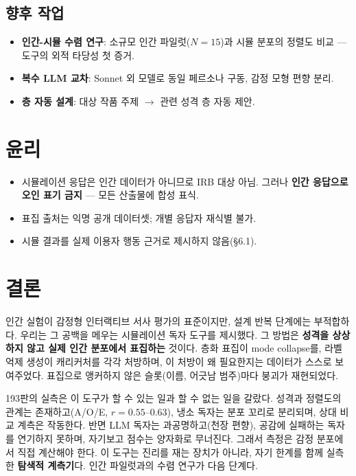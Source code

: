 \documentclass[11pt, a4paper]{article}
\begin{document}
\subsection{향후 작업}

\begin{itemize}
  \item \textbf{인간-시뮬 수렴 연구}: 소규모 인간 파일럿($N=15$)과 시뮬 분포의 정렬도 비교 --- 도구의 외적 타당성 첫 증거.
  \item \textbf{복수 LLM 교차}: Sonnet 외 모델로 동일 페르소나 구동, 감정 모형 편향 분리.
  \item \textbf{층 자동 설계}: 대상 작품 주제 $\rightarrow$ 관련 성격 층 자동 제안.
\end{itemize}

\section{윤리}

\begin{itemize}
  \item 시뮬레이션 응답은 인간 데이터가 아니므로 IRB 대상 아님. 그러나 \textbf{인간 응답으로 오인 표기 금지} --- 모든 산출물에 합성 표식.
  \item 표집 출처는 익명 공개 데이터셋; 개별 응답자 재식별 불가.
  \item 시뮬 결과를 실제 이용자 행동 근거로 제시하지 않음(\S6.1).
\end{itemize}

\section{결론}

인간 실험이 감정형 인터랙티브 서사 평가의 표준이지만, 설계 반복 단계에는 부적합하다. 우리는 그 공백을 메우는 시뮬레이션 독자 도구를 제시했다. 그 방법은 \textbf{성격을 상상하지 않고 실제 인간 분포에서 표집하는} 것이다. 층화 표집이 mode collapse를, 라벨 억제 생성이 캐리커처를 각각 처방하며, 이 처방이 왜 필요한지는 데이터가 스스로 보여주었다. 표집으로 앵커하지 않은 슬롯(이름, 어긋남 범주)마다 붕괴가 재현되었다.

193판의 실측은 이 도구가 할 수 있는 일과 할 수 없는 일을 갈랐다. 성격과 정렬도의 관계는 존재하고(A/O/E, $r = 0.55$--$0.63$), 냉소 독자는 분포 꼬리로 분리되며, 상대 비교 계측은 작동한다. 반면 LLM 독자는 과공명하고(천장 편향), 공감에 실패하는 독자를 연기하지 못하며, 자기보고 점수는 양자화로 무너진다. 그래서 측정은 감정 분포에서 직접 계산해야 한다. 이 도구는 진리를 재는 장치가 아니라, 자기 한계를 함께 실측한 \textbf{탐색적 계측기}다. 인간 파일럿과의 수렴 연구가 다음 단계다.
\end{document}
